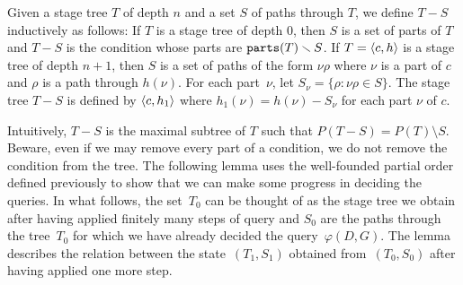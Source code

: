 \begin{definition}
Given a stage tree $T$ of depth $n$ and a set $S$ of paths through $T$,
we define $T - S$ inductively as follows:
If $T$ is a stage tree of depth 0, then $S$ is a set of parts of $T$
and $T - S$ is the condition whose parts are $\mathtt{parts}(T) \smallsetminus S$.
If $T = \left\langle c, h \right\rangle$ is a stage tree of depth $n+1$, then $S$ is a set of paths of the form
$\nu\rho$ where $\nu$ is a part of $c$ and $\rho$ is a path through $h(\nu)$.
For each part~$\nu$, let $S_\nu = \{ \rho : \nu\rho \in S\}$.
The stage tree $T - S$ is defined by $\left\langle c, h_1 \right\rangle$ where $h_1(\nu) = h(\nu) - S_\nu$
for each part $\nu$ of $c$.
\end{definition}

Intuitively, $T - S$ is the maximal subtree of $T$ such that
$P(T - S) = P(T) \setminus S$. Beware, even if we may remove every part of a condition,
we do not remove the condition from the tree.
The following lemma uses the well-founded partial order
defined previously to show that we can make some progress
in deciding the queries. In what follows, the set~$T_0$ can be thought of as
the stage tree we obtain after having applied finitely many steps
of query and $S_0$ are the paths through the tree~$T_0$ for which we have already
decided the query~$\varphi(D, G)$. The lemma describes the relation
between the state~$(T_1, S_1)$ obtained from~$(T_0, S_0)$ after having applied one more step.

